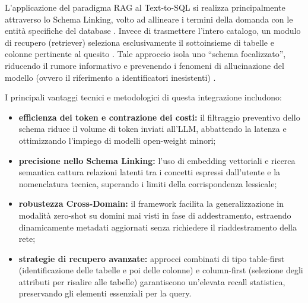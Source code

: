 L'applicazione del paradigma RAG al Text-to-SQL si realizza
principalmente attraverso lo Schema Linking, volto ad allineare i
termini della domanda con le entità specifiche del database \cite{lei-etal-2020-examining,
glass2025extractiveschemalinkingtexttosql, nahid2026rethinkingschemalinkingcontextaware}. Invece di trasmettere l'intero catalogo, un modulo di
recupero (retriever) seleziona esclusivamente il sottoinsieme di
tabelle e colonne pertinente al quesito \cite{glass2025extractiveschemalinkingtexttosql, peng2025xsqlexpertschemalinking}. Tale approccio
isola uno ``schema focalizzato'',
riducendo il rumore informativo e prevenendo i fenomeni di allucinazione
del modello (ovvero il riferimento a identificatori inesistenti)
\cite{glass2025extractiveschemalinkingtexttosql, nahid2026rethinkingschemalinkingcontextaware}.

I principali vantaggi tecnici e metodologici di questa integrazione
includono:

\begin{itemize}
\item
  \textbf{efficienza dei token e contrazione dei costi:} il filtraggio
  preventivo dello schema riduce il volume di token inviati all'LLM,
  abbattendo la latenza e ottimizzando l'impiego di modelli
  open-weight minori; \cite{glass2025extractiveschemalinkingtexttosql, peng2025xsqlexpertschemalinking, nahid2026rethinkingschemalinkingcontextaware}
\item
  \textbf{precisione nello Schema Linking:} l'uso di embedding
  vettoriali e ricerca semantica cattura relazioni latenti tra i
  concetti espressi dall'utente e la nomenclatura tecnica, superando i
  limiti della corrispondenza lessicale; \cite{thinkia2025vectordatabases, geeksforgeeks2024embeddings}
\item
  \textbf{robustezza Cross-Domain:} il framework facilita la
  generalizzazione in modalità zero-shot su domini mai visti in
  fase di addestramento, estraendo dinamicamente metadati aggiornati
  senza richiedere il riaddestramento della rete; \cite{wang-etal-2024-improving-text, hong2025nextgenerationdatabaseinterfacessurvey}
\item
  \textbf{strategie di recupero avanzate:} approcci combinati di tipo
  table-first (identificazione delle tabelle e poi delle colonne)
  e column-first (selezione degli attributi per risalire alle
  tabelle) garantiscono un'elevata recall statistica, preservando
  gli elementi essenziali per la query. \cite{nahid2026rethinkingschemalinkingcontextaware}
\end{itemize}

